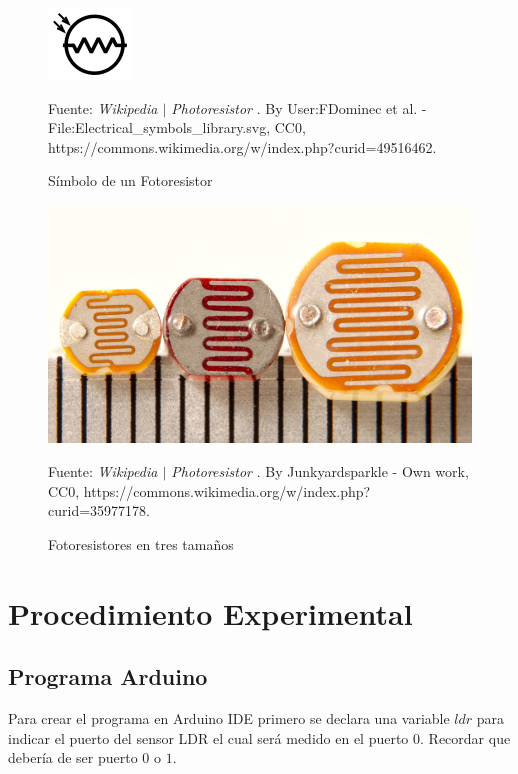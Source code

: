 \documentclass{article}
\begin{document}
\begin{figure}[H]
\centering
\includegraphics[width=0.2\paperwidth]{images/ldr-symbol.png}
\caption{Símbolo de un Fotoresistor}\footnotesize
Fuente: \textit{Wikipedia $\mid$ Photoresistor} \cite{wikipedia-ldr-2022}. By User:FDominec et al. - File:Electrical\_symbols\_library.svg, CC0, https://commons.wikimedia.org/w/index.php?curid=49516462.
\end{figure}

\begin{figure}[H]
\centering
\includegraphics[width=0.2\paperwidth]{images/ldr-three-sizes.jpg}
\caption{Fotoresistores en tres tamaños}\footnotesize
Fuente: \textit{Wikipedia $\mid$ Photoresistor} \cite{wikipedia-ldr-2022}. By Junkyardsparkle - Own work, CC0, https://commons.wikimedia.org/w/index.php?curid=35977178.
\end{figure}

\section{Procedimiento Experimental}

\subsection{Programa Arduino}

Para crear el programa en Arduino IDE primero se declara una variable $ldr$ para indicar el puerto del sensor LDR el cual será medido en el puerto $0$. Recordar que debería de ser puerto $0$ o $1$.
\end{document}
